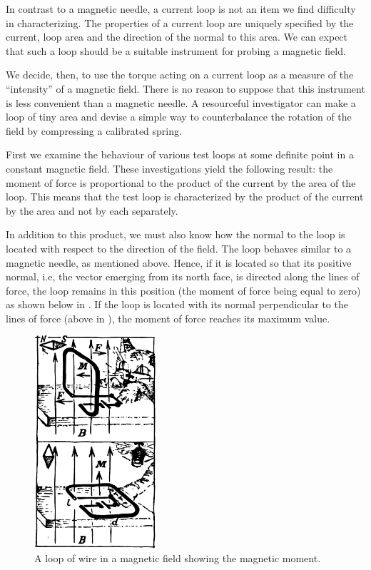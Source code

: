 In contrast to a magnetic needle, a current loop is not an item we find difficulty in characterizing. The properties of a current loop are uniquely specified by the current, loop area and the direction of the normal to this area. We can expect that such a loop should be a suitable instrument for probing a magnetic field.

We decide, then, to use the torque acting on a current loop as a measure of the ``intensity'' of a magnetic field. There is no reason to suppose that this instrument is less convenient than a magnetic needle. A resourceful investigator can make a loop of tiny area and devise a simple way to counterbalance the rotation of the field by compressing a calibrated spring.


First we examine the behaviour of various test loops at some definite point in a constant magnetic field. These investigations yield the following result: the moment of force is proportional to the product of the current by the area of the loop. This means that the test loop is characterized by the product of the current by the area and not by each separately.


In addition to this product, we must also know how the normal to the loop is located with respect to the direction of the field. The loop behaves similar to a magnetic needle, as mentioned above. Hence, if it is located so that its positive normal, i.e, the vector emerging from its north face, is directed along the lines of force, the loop remains in this position (the moment of force being equal to zero) as shown below in . If the loop is located with its normal perpendicular to the lines of force (above in ), the moment of force reaches its maximum value.
\begin{figure}[!ht]
\centering
\includegraphics[width=0.4\textwidth]{figures/fig-03-01.pdf}
\caption{A loop of wire in a magnetic field showing the magnetic moment.}
\label{fig-3.1}
\end{figure}

